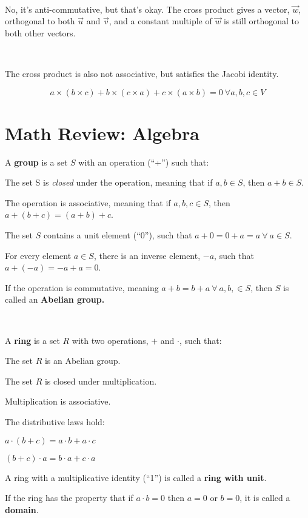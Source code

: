 \documentclass[12pt]{article}
\begin{document}
\begin{spacing}{1.2}
\

No, it's anti-commutative, but that's okay.  The cross product gives a vector, $\vec{w}$, orthogonal to both $\vec{u}$ and $\vec{v}$, and a constant multiple of $\vec{w}$ is still orthogonal to both other vectors.  

\

The cross product is also not associative, but satisfies the Jacobi identity.

$$a \times (b \times c) + b \times (c \times a) + c \times (a \times b) = 0 \ \forall a, b, c \in V$$

\section{Math Review:  Algebra}

A {\bf group} is a set $S$ with an operation (``+'')  such that:

\qquad The set S is {\it closed} under the operation, meaning that if $a,b \in S$, then $a+b \in S$.

\qquad The operation is associative, meaning that if $a,b,c \in S$, then $a+(b+c) = (a+b)+c$.

\qquad The set $S$ contains a unit element (``0''), such that $a+0 = 0+a = a \ \forall \ a \in S.$

\qquad For every element $a \in S$, there is an inverse element, $-a$, such that $a+(-a) = -a + a = 0$.

If the operation is commutative, meaning $a+b = b+a \ \forall \ a, b, \in S$, then $S$ is called an {\bf Abelian group.}

\

A {\bf ring} is a set $R$ with two operations, $+$ and $\cdot$, such that:

\qquad The set $R$ is an Abelian group.  

\qquad The set $R$ is closed under multiplication.

\qquad Multiplication is associative.  

\qquad The distributive laws hold:

\qquad \qquad $a \cdot (b+c) = a \cdot b + a \cdot c$

\qquad \qquad $(b+c) \cdot a = b \cdot a + c \cdot a$

A ring with a multiplicative identity (``1'') is called a {\bf ring with unit}.

If the ring has the property that if $a\cdot b = 0$ then $a=0$ or $b=0$, it is called a {\bf domain}.


\end{spacing}
\end{document}
